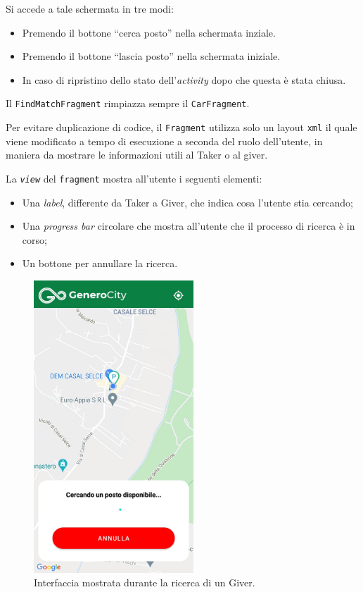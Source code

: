 Si accede a tale schermata in tre modi:

\begin{itemize}
    \item Premendo il bottone ``cerca posto'' nella schermata inziale.
    \item Premendo il bottone ``lascia posto'' nella schermata iniziale.
    \item In caso di ripristino dello stato dell'\emph{activity} dopo che questa è stata chiusa.
\end{itemize}
Il \texttt{FindMatchFragment} rimpiazza sempre il \texttt{CarFragment}.

Per evitare duplicazione di codice, il \texttt{Fragment} utilizza solo un layout \texttt{xml} il quale viene modificato a tempo di esecuzione a seconda del ruolo dell'utente, in maniera da mostrare le informazioni utili al Taker o al giver.

La \emph{\texttt{view}} del \texttt{fragment} mostra all'utente i seguenti elementi:

\begin{itemize}
    \item Una \emph{label}, differente da Taker a Giver, che indica cosa l'utente stia cercando;
    \item Una \emph{progress bar} circolare che mostra all'utente che il processo di ricerca è in corso;
    \item Un bottone per annullare la ricerca.
\end{itemize}

\begin{figure}[H]
\centering
\includegraphics[width=6cm]{images/find_giver.jpg}
\caption{Interfaccia mostrata durante la ricerca di un Giver.}
\end{figure}

